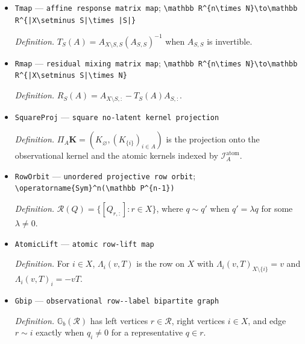 \documentclass{article}
\begin{document}
\begin{itemize}
  \item \texttt{Tmap} --- \texttt{affine response matrix map}; \texttt{\textbackslash{}\allowbreak{}mathbb R\textasciicircum{}\{n\textbackslash{}\allowbreak{}times N\}\allowbreak{}\textbackslash{}\allowbreak{}to\textbackslash{}\allowbreak{}mathbb R\textasciicircum{}\{|X\textbackslash{}\allowbreak{}setminus S|\textbackslash{}\allowbreak{}times |S|\}\allowbreak{}}
  \par\smallskip\noindent\emph{Definition.} \(T_S(A)=A_{X\setminus S,S}(A_{S,S})^{-1}\) when \(A_{S,S}\) is invertible.
  \item \texttt{Rmap} --- \texttt{residual mixing matrix map}; \texttt{\textbackslash{}\allowbreak{}mathbb R\textasciicircum{}\{n\textbackslash{}\allowbreak{}times N\}\allowbreak{}\textbackslash{}\allowbreak{}to\textbackslash{}\allowbreak{}mathbb R\textasciicircum{}\{|X\textbackslash{}\allowbreak{}setminus S|\textbackslash{}\allowbreak{}times N\}\allowbreak{}}
  \par\smallskip\noindent\emph{Definition.} \(R_S(A)=A_{X\setminus S,:}-T_S(A)A_{S,:}\).
  \item \texttt{SquareProj} --- \texttt{square no-\allowbreak{}latent kernel projection}
  \par\smallskip\noindent\emph{Definition.} \(\Pi_A\mathbf K=(K_{\varnothing},(K_{\{i\}})_{i\in A})\) is the projection onto the observational kernel and the atomic kernels indexed by \(\mathcal I_A^{\mathrm{atom}}\).
  \item \texttt{RowOrbit} --- \texttt{unordered projective row orbit}; \texttt{\textbackslash{}\allowbreak{}operatorname\{Sym\}\allowbreak{}\textasciicircum{}n(\textbackslash{}\allowbreak{}mathbb P\textasciicircum{}\{n-\allowbreak{}1\}\allowbreak{})}
  \par\smallskip\noindent\emph{Definition.} \(\mathscr R(Q)=\{[Q_{r,:}]:r\in X\}\), where \(q\sim q'\) when \(q'=\lambda q\) for some \(\lambda\ne0\).
  \item \texttt{AtomicLift} --- \texttt{atomic row-\allowbreak{}lift map}
  \par\smallskip\noindent\emph{Definition.} For \(i\in X\), \(\Lambda_i(v,T)\) is the row on \(X\) with \(\Lambda_i(v,T)_{X\setminus\{i\}}=v\) and \(\Lambda_i(v,T)_i=-vT\).
  \item \texttt{Gbip} --- \texttt{observational row-\allowbreak{}-\allowbreak{}label bipartite graph}
  \par\smallskip\noindent\emph{Definition.} \(\mathbb G_b(\mathscr R)\) has left vertices \(r\in\mathscr R\), right vertices \(i\in X\), and edge \(r\sim i\) exactly when \(q_i\ne0\) for a representative \(q\in r\).

\end{itemize}
\end{document}

